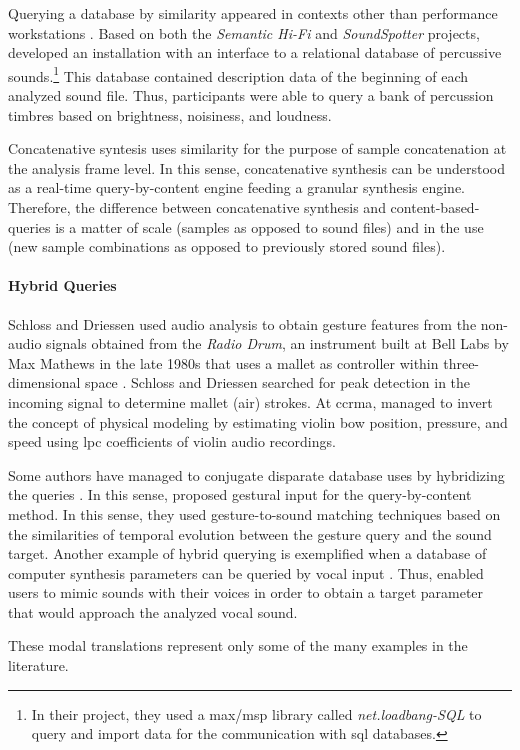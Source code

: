 {	Querying a database by similarity appeared in contexts other than performance workstations \parencite{Price2008}. Based on both the \textit{Semantic Hi-Fi} and \textit{SoundSpotter} projects, \citeauthor{Price2008} developed an installation with an interface to a relational database of percussive sounds.\footnote{In their project, they used a \gls{max/msp} library called \textit{net.loadbang-SQL} to query and import data for the communication with \gls{sql} databases.} This database contained description data of the beginning of each analyzed sound file. Thus, participants were able to query a bank of percussion timbres based on brightness, noisiness, and loudness. 

	Concatenative syntesis uses similarity for the purpose of sample concatenation at the analysis frame level. In this sense, concatenative synthesis can be understood as a real-time query-by-content engine feeding a granular synthesis engine. Therefore, the difference between concatenative synthesis and content-based-queries is a matter of scale (samples as opposed to sound files) and in the use (new sample combinations as opposed to previously stored sound files). 


	\paragraph{Hybrid Queries}
	Schloss and Driessen \parencite{icmc/bbp2372.2001.103} used audio analysis to obtain gesture features from the non-audio signals obtained from the \textit{Radio Drum}, an instrument built at Bell Labs by Max Mathews in the late 1980s that uses a mallet as controller within three-dimensional space \parencite{DBLP:conf/icmc/Boie89}. Schloss and Driessen searched for peak detection in the incoming signal to determine mallet (air) strokes. At \gls{ccrma}, \citeauthor{icmc/bbp2372.2001.071} \parencite{icmc/bbp2372.2001.071} managed to invert the concept of physical modeling by estimating violin bow position, pressure, and speed using \gls{lpc} coefficients of violin audio recordings. 

	Some authors have managed to conjugate disparate database uses by hybridizing the queries \parencite{Caramiaux2011}. In this sense, \citeauthor{Caramiaux2011} proposed gestural input for the query-by-content method. In this sense, they used gesture-to-sound matching techniques based on the similarities of temporal evolution between the gesture query and the sound target. Another example of hybrid querying is exemplified when a database of computer synthesis parameters can be queried by vocal input \parencite{mcartwright:2014}. Thus, \citeauthor{mcartwright:2014} enabled users to mimic sounds with their voices in order to obtain a target parameter that would approach the analyzed vocal sound. 

	These modal translations represent only some of the many examples in the literature.
}
